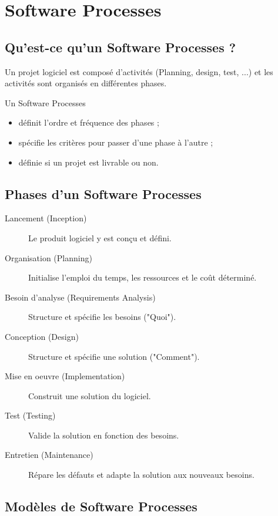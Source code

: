 \section{Software Processes}



\subsection{Qu'est-ce qu'un Software Processes ?}
Un projet logiciel est composé d'activités (Planning, design, test, ...) et les activités sont organisés en différentes phases.

Un Software Processes
\begin{itemize}
    \item définit l'ordre et fréquence des phases ;
    \item spécifie les critères pour passer d'une phase à l'autre ;
    \item définie si un projet est livrable ou non.
\end{itemize}



\subsection{Phases d'un Software Processes}
\begin{description}
    \item [Lancement (Inception)] Le produit logiciel y est conçu et défini.
    \item [Organisation (Planning)] Initialise l'emploi du temps, les ressources et le coût déterminé.
    \item [Besoin d'analyse (Requirements Analysis)] Structure et spécifie les besoins ("Quoi").
    \item [Conception (Design)] Structure et spécifie une solution ("Comment").
    \item [Mise en oeuvre (Implementation)] Construit une solution du logiciel.
    \item [Test (Testing)] Valide la solution en fonction des besoins.
    \item [Entretien (Maintenance)] Répare les défauts et adapte la solution aux nouveaux besoins.
\end{description}



\subsection{Modèles de Software Processes}



